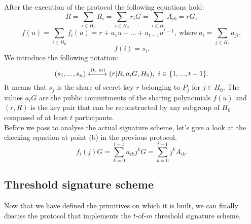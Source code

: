 After the execution of the protocol the following equations hold:
$$R = \sum_{i \in H_0} R_i = \sum_{i \in H_0}r_iG = \sum_{i \in H_0}A_{i0} = rG,$$
$$f(u) = \sum_{i \in H_0} f_i(u) = r + a_1u + ... + a_{t - 1}u^{t - 1}, \ \text{where} \ a_i = \sum_{j \in H_0}a_{ji},$$
$$f(i) = s_i.$$
We introduce the following notation: 
$$(s_1, ..., s_n) \xleftrightarrow{\text{(t, m)}} (r|R, a_iG, H_0), \ i \in \{1, ..., t - 1\}.$$
It means that $s_j$ is the share of secret key $r$ belonging to $P_j$ for $j \in H_0$. The values $a_iG$
are the public commitments of the sharing polynomials $f(u)$ and $(r, R)$ is the key pair that can be reconstructed by any subgroup of $H_0$ composed of at least $t$ participants. 
\\
Before we pass to analyse the actual signature scheme, let's give a look at the checking equation at point (b) in the previous protocol.
$$f_i(j)G = \sum_{k = 0}^{t - 1}a_{ik}j^kG = \sum_{k = 0}^{t - 1}j^kA_{ik}.$$

\subsection{Threshold signature scheme}
Now that we have defined the primitives on which it is built, we can finally discuss the protocol that implements the $t$-of-$m$ threshold signature scheme. 

